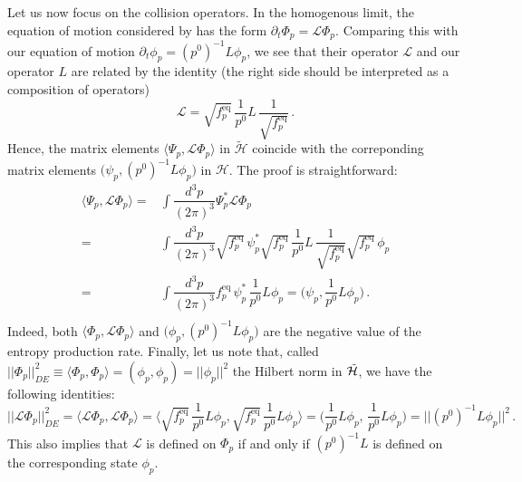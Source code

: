 \documentclass[a4paper, amsfonts, amssymb, amsmath, reprint, showkeys, nofootinbib, twoside, onecolumn,notitlepage,,longbibliography]{revtex4-2}
\theoremstyle{definition}
\theoremstyle{theorem}
\theoremstyle{corollary}
\begin{document}
Let us now focus on the collision operators. In the homogenous limit, the equation of motion considered by \cite{Dudynski1988} has the form $\partial_t \Phi_p=\mathcal{L}\Phi_p$. Comparing this with our equation of motion $\partial_t \phi_p=(p^0)^{-1}L\phi_p$, we see that their operator $\mathcal{L}$ and our operator $L$ are related by the identity (the right side should be interpreted as a composition of operators)
\begin{equation}
\mathcal{L}= \sqrt{f^{\text{eq}}_p} \, \dfrac{1}{p^0} L \, \dfrac{1}{\sqrt{f^{\text{eq}}_p}} \, .
\end{equation}
Hence, the matrix elements $\langle \Psi_p,\mathcal{L} \Phi_p \rangle$ in $\tilde{\mathcal{H}}$ coincide with the correponding matrix elements $\big( \psi_p,(p^0)^{-1}L\phi_p \big)$ in $\mathcal{H}$. The proof is straightforward:
\begin{equation}
\begin{split}
\langle \Psi_p,\mathcal{L}\Phi_p \rangle ={}& \int \dfrac{d^3 p}{(2\pi)^3} \Psi^*_p \mathcal{L} \Phi_p \\
={}& \int \dfrac{d^3 p}{(2\pi)^3} \sqrt{f^{\text{eq}}_p} \, \psi^*_p \sqrt{f^{\text{eq}}_p} \, \dfrac{1}{p^0} L \, \dfrac{1}{\sqrt{f^{\text{eq}}_p}} \sqrt{f^{\text{eq}}_p} \, \phi_p \\
={}& \int \dfrac{d^3 p}{(2\pi)^3} f^{\text{eq}}_p \, \psi^*_p \, \dfrac{1}{p^0} L  \phi_p = \bigg(\psi_p, \dfrac{1}{p^0} L \phi_p  \bigg) \, . \\
\end{split}
\end{equation}
Indeed, both $\langle \Phi_p,\mathcal{L}\Phi_p \rangle$ and $\big( \phi_p,(p^0)^{-1}L\phi_p \big)$ are the negative value of the entropy production rate. Finally, let us note that, called $||\Phi_p ||_{DE}^2 \equiv \langle \Phi_p, \Phi_p \rangle=(\phi_p,\phi_p)=||\phi_p||^2$ the Hilbert norm in $\Tilde{\mathcal{H}}$, we have the following identities:
\begin{equation}\label{fourtisixxxx}
||\mathcal{L}\Phi_p||^2_{DE}=\langle \mathcal{L}\Phi_p,\mathcal{L}\Phi_p \rangle =\bigg\langle \sqrt{f^{\text{eq}}_p} \, \dfrac{1}{p^0} L \phi_p, \sqrt{f^{\text{eq}}_p} \, \dfrac{1}{p^0} L \phi_p \bigg\rangle = \bigg( \dfrac{1}{p^0} L \phi_p,  \, \dfrac{1}{p^0} L \phi_p \bigg) =|| (p^0)^{-1}L\phi_p||^2 \, . 
\end{equation}
This also implies that $\mathcal{L}$ is defined on $\Phi_p$ if and only if $(p^0)^{-1}L$ is defined on the corresponding state $\phi_p$.
\end{document}
